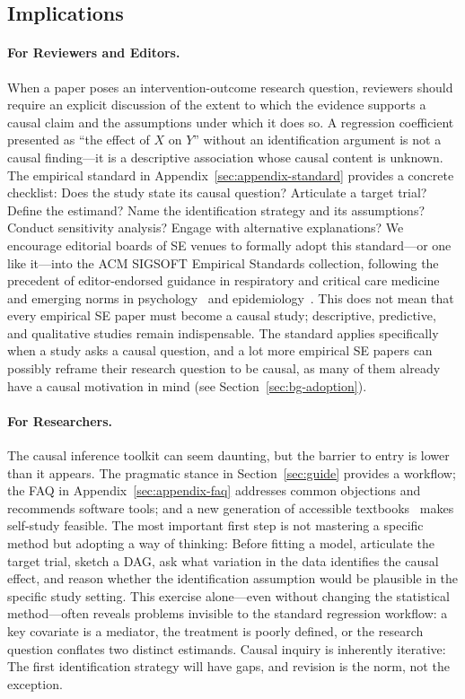 \subsection{Implications}

\paragraph{For Reviewers and Editors.}
When a paper poses an intervention-outcome research question, reviewers should require an explicit discussion of the extent to which the evidence supports a causal claim and the assumptions under which it does so.
A regression coefficient presented as ``the effect of $X$ on $Y$'' without an identification argument is not a causal finding---it is a descriptive association whose causal content is unknown.
The empirical standard in Appendix~\ref{sec:appendix-standard} provides a concrete checklist: Does the study state its causal question? Articulate a target trial? Define the estimand? Name the identification strategy and its assumptions? Conduct sensitivity analysis? Engage with alternative explanations?
We encourage editorial boards of SE venues to formally adopt this standard---or one like it---into the ACM SIGSOFT Empirical Standards collection, following the precedent of editor-endorsed guidance in respiratory and critical care medicine~\cite{lederer2019control} and emerging norms in psychology~\cite{grosz2020taboo} and epidemiology~\cite{hernan2018cword}.
This does not mean that every empirical SE paper must become a causal study; descriptive, predictive, and qualitative studies remain indispensable.
The standard applies specifically when a study asks a causal question, and a lot more empirical SE papers can possibly reframe their research question to be causal, as many of them already have a causal motivation in mind (see Section~\ref{sec:bg-adoption}).

\paragraph{For Researchers.}
The causal inference toolkit can seem daunting, but the barrier to entry is lower than it appears.
The pragmatic stance in Section~\ref{sec:guide} provides a workflow; the FAQ in Appendix~\ref{sec:appendix-faq} addresses common objections and recommends software tools; and a new generation of accessible textbooks~\cite{cunningham2021causal, huntingtonklein2021effect, hernan2020causal, angrist2009mostly} makes self-study feasible.
The most important first step is not mastering a specific method but adopting a way of thinking: Before fitting a model, articulate the target trial, sketch a DAG, ask what variation in the data identifies the causal effect, and reason whether the identification assumption would be plausible in the specific study setting.
This exercise alone---even without changing the statistical method---often reveals problems invisible to the standard regression workflow: a key covariate is a mediator, the treatment is poorly defined, or the research question conflates two distinct estimands.
Causal inquiry is inherently iterative: The first identification strategy will have gaps, and revision is the norm, not the exception.

